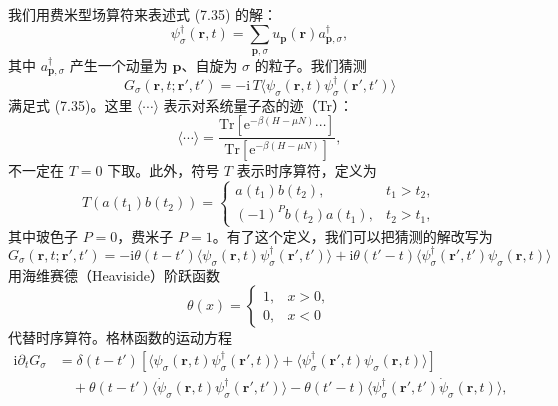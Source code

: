 我们用费米型场算符来表述式 (7.35) 的解：
\begin{equation*}
\psi_{\sigma}^{\dagger}(\mathbf{r},t)=\sum_{\mathbf{p},\sigma}u_{\mathbf{p}}(\mathbf{r})a_{\mathbf{p},\sigma}^{\dagger},\tag{7.37}
\end{equation*}
其中 $a_{\mathbf{p},\sigma}^{\dagger}$ 产生一个动量为 $\mathbf{p}$、自旋为 $\sigma$ 的粒子。我们猜测
\begin{equation*}
G_{\sigma}(\mathbf{r},t;\mathbf{r}',t')=-\mathrm{i}\,T\langle\psi_{\sigma}(\mathbf{r},t)\psi_{\sigma}^{\dagger}(\mathbf{r}',t')\rangle\tag{7.38}
\end{equation*}
满足式 (7.35)。这里 $\langle\cdots\rangle$ 表示对系统量子态的迹（Tr）：
\begin{equation*}
\langle\cdots\rangle=\frac{\mathrm{Tr}\left[\mathrm{e}^{-\beta(H-\mu N)}\cdots\right]}{\mathrm{Tr}\left[\mathrm{e}^{-\beta(H-\mu N)}\right]},\tag{7.39}
\end{equation*}
不一定在 $T=0$ 下取。此外，符号 $T$ 表示时序算符，定义为
\begin{equation*}
T(a(t_{1})b(t_{2}))=
\begin{cases}
a(t_{1})b(t_{2}), & t_{1}>t_{2},\\
(-1)^{P}b(t_{2})a(t_{1}), & t_{2}>t_{1},
\end{cases}\tag{7.40}
\end{equation*}
其中玻色子 $P=0$，费米子 $P=1$。有了这个定义，我们可以把猜测的解改写为
\begin{equation*}
G_{\sigma}(\mathbf{r},t;\mathbf{r}',t')=-\mathrm{i}\theta(t-t')\langle\psi_{\sigma}(\mathbf{r},t)\psi_{\sigma}^{\dagger}(\mathbf{r}',t')\rangle+\mathrm{i}\theta(t'-t)\langle\psi_{\sigma}^{\dagger}(\mathbf{r}',t')\psi_{\sigma}(\mathbf{r},t)\rangle\tag{7.41}
\end{equation*}
用海维赛德（Heaviside）阶跃函数
\begin{equation*}
\theta(x)=
\begin{cases}
1, & x>0,\\
0, & x<0
\end{cases}\tag{7.42}
\end{equation*}
代替时序算符。格林函数的运动方程
\begin{equation*}
\begin{aligned}
\mathrm{i}\partial_{t}G_{\sigma}&=\delta(t-t')\left[\langle\psi_{\sigma}(\mathbf{r},t)\psi_{\sigma}^{\dagger}(\mathbf{r}',t)\rangle+\langle\psi_{\sigma}^{\dagger}(\mathbf{r}',t)\psi_{\sigma}(\mathbf{r},t)\rangle\right]\\
&\quad+\theta(t-t')\langle\dot{\psi}_{\sigma}(\mathbf{r},t)\psi_{\sigma}^{\dagger}(\mathbf{r}',t')\rangle-\theta(t'-t)\langle\psi_{\sigma}^{\dagger}(\mathbf{r}',t')\dot{\psi}_{\sigma}(\mathbf{r},t)\rangle,
\end{aligned}\tag{7.43}
\end{equation*}
